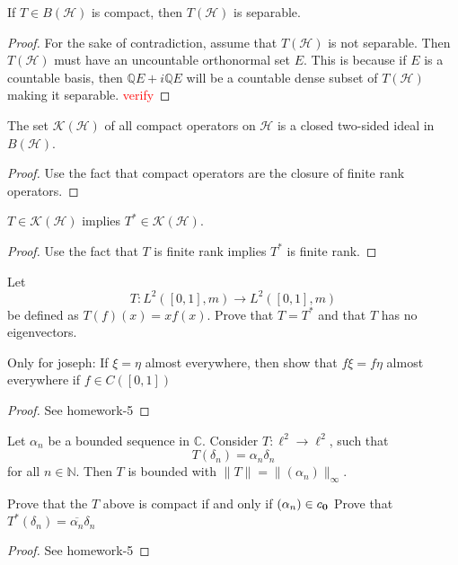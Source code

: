 
\begin{lemma}
  If $T \in B(\mathcal{H})$ is compact, then $T(\mathcal{H})$ is separable.
\end{lemma}
\begin{proof}
  For the sake of contradiction, assume that $T(\mathcal{H})$ is not
  separable. Then $T(\mathcal{H})$ must have an uncountable orthonormal set $E$.
  This is because if $E$ is a countable basis, then $\mathbb{Q}E + i
  \mathbb{Q}E$ will be a countable dense subset of
  $T(\mathcal{H})$ making it separable. \textcolor{red}{verify}
\end{proof}

\begin{corollary}
  The set $\mathcal{K}(\mathcal{H})$ of all compact operators on $
  \mathcal{H}$ is a closed
  two-sided ideal in $B(\mathcal{H})$.
\end{corollary}
\begin{proof}
  Use the fact that compact operators are
  the closure of finite rank operators.
\end{proof}

\begin{corollary}
  $T \in \mathcal{K}(\mathcal{H})$ implies $T^* \in \mathcal{K}(\mathcal{H})$.
\end{corollary}
\begin{proof}
  Use the fact that $T$ is finite rank
  implies $T^*$ is finite rank.
\end{proof}

\begin{example}
  Let \[
    T: L^2([0, 1], m) \to L^2([0, 1], m)
  \]
  be defined as $T(f)(x) = xf(x)$. Prove that $T = T^*$ and that $T$
  has no eigenvectors.

  Only for joseph: If $\xi = \eta$ almost everywhere, then show that  $f \xi = f
  \eta$ almost everywhere if $ f \in C([0, 1])$
\end{example}
\begin{proof}
  See homework-5
\end{proof}

\begin{example}
  Let $\alpha_n$ be a bounded sequence in $\mathbb{C}$. Consider $T :
  \ell^2 \to \ell^2$, such that \[
    T(\delta_n) = \alpha_n \delta_n
  \]
  for all $n \in \mathbb{N}$. Then $T$ is bounded with $\|T\| =
  \|(\alpha_n)\|_\infty$.
\end{example}

\begin{example}
  \label{CompactiffEigvalsconverge0}
  Prove that the $T$ above is compact if and only if $(\alpha_n) \in c_{\bf 0}$
  Prove that $T^*(\delta_n) = \overline{\alpha_n}\delta_n$
\end{example}
\begin{proof}
  See homework-5
\end{proof}

